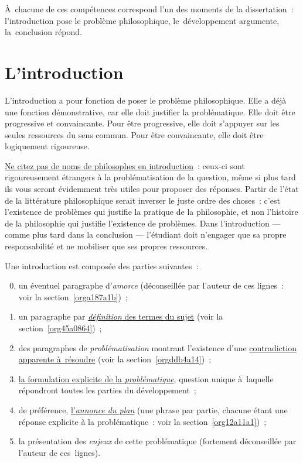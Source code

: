 \documentclass[a4paper,12pt]{report}
\begin{document}
À chacune de ces compétences correspond l'un des moments de la
dissertation : l'introduction pose le problème philosophique,
le développement argumente, la conclusion répond.


\chapter{L'introduction}
\label{sec:orgb193315}
\label{orgf5d9f0e}

L'introduction a pour fonction de poser le problème philosophique. Elle
a déjà une fonction démonstrative, car elle doit justifier la
problématique. Elle doit être progressive et convaincante. Pour être
progressive, elle doit s'appuyer sur les seules ressources du sens
commun. Pour être convaincante, elle doit être logiquement rigoureuse.

\uline{Ne citez pas de noms de philosophes en introduction} : ceux-ci sont
rigoureusement étrangers à la problématisation de la question, même si
plus tard ils vous seront évidemment très utiles pour proposer des
réponses. Partir de l'état de la littérature philosophique serait
inverser le juste ordre des choses : c'est l'existence de problèmes qui
justifie la pratique de la philosophie, et non l'histoire de la
philosophie qui justifie l'existence de problèmes. Dans l'introduction
--- comme plus tard dans la conclusion --- l'étudiant doit n'engager que
sa propre responsabilité et ne mobiliser que ses propres ressources.

Une introduction est composée des parties suivantes :

\begin{enumerate}
\setcounter{enumi}{-1}
\item un éventuel paragraphe d'\emph{amorce} (déconseillée par l'auteur de
ces lignes : voir la section \ref{orga187a1b}) ;

\item un paragraphe par \uline{\emph{définition} des termes du sujet} (voir la
section \ref{org45a0864}) ;

\item des paragraphes de \emph{problématisation} montrant l'existence d'une
\uline{contradiction apparente à résoudre} (voir la
section \ref{orgddb4a14}) ;

\item \uline{la formulation explicite de la \emph{problématique}}, question unique
à laquelle répondront toutes les parties du développement ;

\item de préférence, \uline{l'\emph{annonce du plan}} (une phrase par partie, chacune
étant une réponse explicite à la problématique : voir la
section \ref{org12a11a1}) ;

\setcounter{enumi}{-1}
\item la présentation des \emph{enjeux} de cette problématique (fortement
déconseillée par l'auteur de ces lignes).
\end{enumerate}
\end{document}
